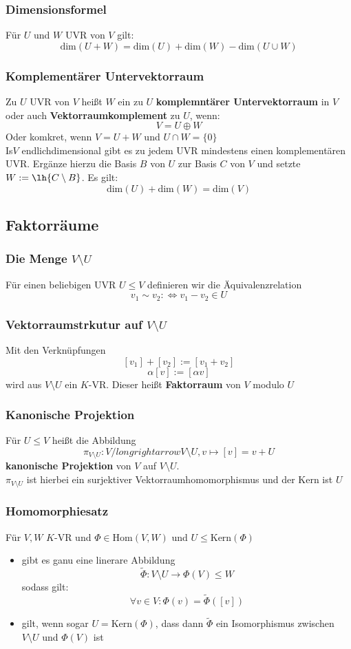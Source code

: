 \documentclass{kit}
\begin{document}
    \subsubsection{Dimensionsformel}
      Für $U$ und $W$ UVR von $V$ gilt:
      $$\text{dim}(U+W)=\text{dim}(U)+\text{dim}(W)-\text{dim}(U\cup W)$$
    \subsubsection{Komplementärer Untervektorraum}
      Zu $U$ UVR von $V$ heißt $W$ ein zu $U$ \textbf{komplemntärer Untervektorraum} in $V$ oder auch \textbf{Vektorraumkomplement} zu $U$, wenn:
      $$V=U\oplus W$$
      Oder komkret, wenn $V=U+W$ und $U\cap W=\{0\}$\\
      Is$V$ endlichdimensional gibt es zu jedem UVR mindestens einen komplementären UVR. Ergänze hierzu die Basis $B$ von $U$ zur Basis $C$ von $V$ und setzte $W:=\lh{C\setminus B}$. Es gilt:
      $$\text{dim}(U)+\text{dim}(W)=\text{dim}(V)$$
  \subsection{Faktorräume}
    \subsubsection{Die Menge \texorpdfstring{$V\setminus U$}\ }
      Für einen beliebigen UVR $U\le V$ definieren wir die Äquivalenzrelation
      $$v_1\sim v_2:\Leftrightarrow v_1-v_2\in U$$
    \subsubsection{Vektorraumstrkutur auf \texorpdfstring{$V\setminus U$}\ }
      Mit den Verknüpfungen
      $$[v_1]+[v_2]:=[v_1+v_2]$$
      $$\alpha[v]:=[\alpha v]$$
      wird aus $V\setminus U$ ein $K$-VR. Dieser heißt \textbf{Faktorraum} von $V$ modulo $U$
    \subsubsection{Kanonische Projektion}
      Für $U\le V$ heißt die Abbildung
      $$\pi_{V\setminus U}:V/longrightarrow V\setminus U, v\mapsto[v]=v+U$$
      \textbf{kanonische Projektion} von $V$ auf $V\setminus U$.\\
      $\pi_{V\setminus U}$ ist hierbei ein surjektiver Vektorraumhomomorphismus und der Kern ist $U$
    \subsubsection{Homomorphiesatz}
      Für $V,W$ $K$-VR und $\Phi\in\text{Hom}(V,W)$ und $U\le\text{Kern}(\Phi)$
      \begin{itemize}
        \item gibt es ganu eine linerare Abbildung
          $$\tilde\Phi:V\setminus U\longrightarrow\Phi(V)\le W$$
          sodass gilt:
          $$\forall v\in V:\Phi(v)=\tilde\Phi([v])$$
        \item gilt, wenn sogar $U=\text{Kern}(\Phi)$, dass dann $\tilde\Phi$ ein Isomorphismus zwischen $V\setminus U$ und $\Phi(V)$ ist
      \end{itemize}
\end{document}
